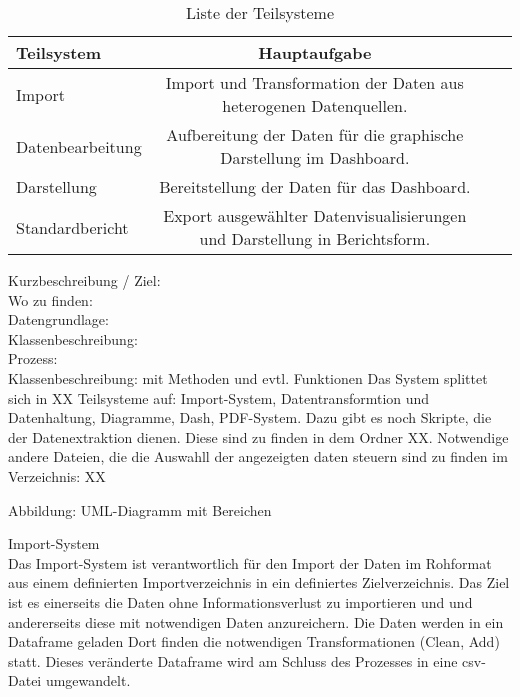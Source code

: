     \begingroup
\setlength{\tabcolsep}{4pt} %
\renewcommand{\arraystretch}{1.5}
\begin{table}[h]
    \centering
    \begin{adjustbox}{max width=\textwidth}
    \Huge
    \begin{tabular}{lccl}
       \toprule
       \textbf{Teilsystem}             &{Hauptaufgabe} \\
       \midrule     
            Import               &Import und Transformation der Daten aus heterogenen Datenquellen.\\
            Datenbearbeitung     &Aufbereitung der Daten für die graphische Darstellung im Dashboard.\\
            Darstellung          &Bereitstellung der Daten für das Dashboard.\\
            Standardbericht      &Export ausgewählter Datenvisualisierungen und Darstellung in Berichtsform.\\
            
        \bottomrule
    \end{tabular}
    \end{adjustbox}
    \caption{%
        Liste der Teilsysteme
    \label{tab:Teilsysteme}
    }
     \end{table}
\endgroup
    
    
    
    
    Kurzbeschreibung / Ziel:\\
    Wo zu finden:\\
    Datengrundlage:\\
    Klassenbeschreibung:\\
    Prozess:\\
    
    Klassenbeschreibung: mit Methoden und evtl. Funktionen
    Das System splittet sich in XX Teilsysteme auf: Import-System, Datentransformtion und Datenhaltung, Diagramme, Dash, PDF-System. Dazu gibt es noch Skripte,
    die der Datenextraktion dienen. Diese sind zu finden in dem Ordner XX. Notwendige andere Dateien, die die Auswahll der angezeigten daten steuern sind zu finden im Verzeichnis: XX
    
    Abbildung: UML-Diagramm mit Bereichen
    
    
    Import-System\\
    Das Import-System ist verantwortlich für den Import der Daten im Rohformat aus einem definierten Importverzeichnis in ein definiertes Zielverzeichnis. Das Ziel
    ist es einerseits die Daten ohne Informationsverlust zu importieren und und andererseits diese mit notwendigen Daten anzureichern. Die Daten werden in ein Dataframe geladen          Dort finden die notwendigen Transformationen (Clean, Add) statt. Dieses veränderte Dataframe wird am Schluss des Prozesses in eine csv-Datei umgewandelt.
    
